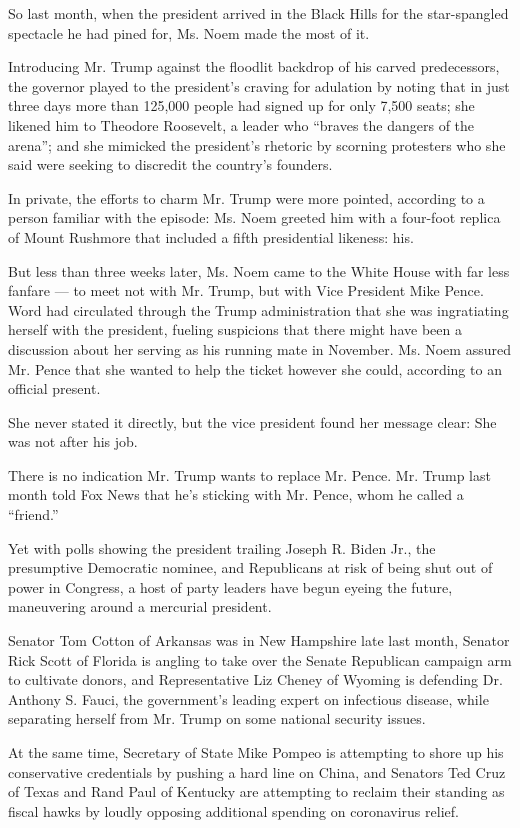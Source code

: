 So last month, when the president arrived in the Black Hills for the
star-spangled spectacle he had pined for, Ms. Noem made the most of it.

Introducing Mr. Trump against the floodlit backdrop of his carved
predecessors, the governor played to the president's craving for
adulation by noting that in just three days more than 125,000 people had
signed up for only 7,500 seats; she likened him to Theodore Roosevelt, a
leader who ``braves the dangers of the arena''; and she mimicked the
president's rhetoric by scorning protesters who she said were seeking to
discredit the country's founders.

In private, the efforts to charm Mr. Trump were more pointed, according
to a person familiar with the episode: Ms. Noem greeted him with a
four-foot replica of Mount Rushmore that included a fifth presidential
likeness: his.

But less than three weeks later, Ms. Noem came to the White House with
far less fanfare --- to meet not with Mr. Trump, but with Vice President
Mike Pence. Word had circulated through the Trump administration that
she was ingratiating herself with the president, fueling suspicions that
there might have been a discussion about her serving as his running mate
in November. Ms. Noem assured Mr. Pence that she wanted to help the
ticket however she could, according to an official present.

She never stated it directly, but the vice president found her message
clear: She was not after his job.

There is no indication Mr. Trump wants to replace Mr. Pence. Mr. Trump
last month told Fox News that he's sticking with Mr. Pence, whom he
called a ``friend.''

Yet with polls showing the president trailing Joseph R. Biden Jr., the
presumptive Democratic nominee, and Republicans at risk of being shut
out of power in Congress, a host of party leaders have begun eyeing the
future, maneuvering around a mercurial president.

Senator Tom Cotton of Arkansas was in New Hampshire late last month,
Senator Rick Scott of Florida is angling to take over the Senate
Republican campaign arm to cultivate donors, and Representative Liz
Cheney of Wyoming is defending Dr. Anthony S. Fauci, the government's
leading expert on infectious disease, while separating herself from Mr.
Trump on some national security issues.

At the same time, Secretary of State Mike Pompeo is attempting to shore
up his conservative credentials by pushing a hard line on China, and
Senators Ted Cruz of Texas and Rand Paul of Kentucky are attempting to
reclaim their standing as fiscal hawks by loudly opposing additional
spending on coronavirus relief.

